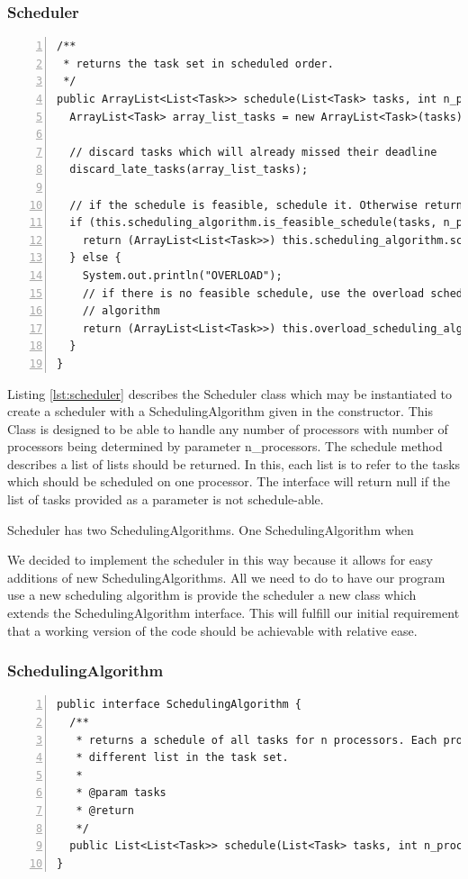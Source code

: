 \documentclass{article} %
\begin{document}
\subsubsection{Scheduler}
\begin{lstlisting}[caption={The scheduler uses a scheduling algorithm to choose the order of tasks},label={lst:scheduler},numbers=left]
/**
 * returns the task set in scheduled order.
 */
public ArrayList<List<Task>> schedule(List<Task> tasks, int n_processors) {
  ArrayList<Task> array_list_tasks = new ArrayList<Task>(tasks);

  // discard tasks which will already missed their deadline
  discard_late_tasks(array_list_tasks);

  // if the schedule is feasible, schedule it. Otherwise return null.
  if (this.scheduling_algorithm.is_feasible_schedule(tasks, n_processors)) {
    return (ArrayList<List<Task>>) this.scheduling_algorithm.schedule(array_list_tasks, n_processors);
  } else {
    System.out.println("OVERLOAD");
    // if there is no feasible schedule, use the overload scheduling
    // algorithm
    return (ArrayList<List<Task>>) this.overload_scheduling_algorithm.schedule(array_list_tasks, n_processors);
  }
}
\end{lstlisting}

Listing \ref{lst:scheduler} describes the Scheduler class which may be instantiated to create a scheduler with a SchedulingAlgorithm given in the constructor.
This Class is designed to be able to handle any number of processors with number of processors being determined by parameter n\_processors.
The schedule method describes a list of lists should be returned.
In this, each list is to refer to the tasks which should be scheduled on one processor.
The interface will return null if the list of tasks provided as a parameter is not schedule-able.

Scheduler has two SchedulingAlgorithms.
One SchedulingAlgorithm when %

We decided to implement the scheduler in this way because it allows for easy additions of new SchedulingAlgorithms.
All we need to do to have our program use a new scheduling algorithm is provide the scheduler a new class which extends the SchedulingAlgorithm interface.
This will fulfill our initial requirement that a working version of the code should be achievable with relative ease.

\subsubsection{SchedulingAlgorithm}
\begin{lstlisting}[caption={Scheduling Algorithm interface},label={lst:SchedulingAlgorithm},numbers=left]
public interface SchedulingAlgorithm {
  /**
   * returns a schedule of all tasks for n processors. Each processor has a
   * different list in the task set.
   * 
   * @param tasks
   * @return
   */
  public List<List<Task>> schedule(List<Task> tasks, int n_processors);
}
\end{lstlisting}
\end{document}
